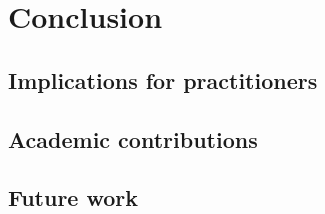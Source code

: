 \chapter{Conclusion}
\label{chap:conclusion}

\section{Implications for practitioners}

\section{Academic contributions}

\section{Future work}
